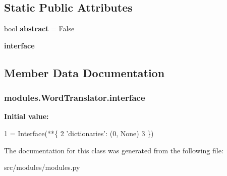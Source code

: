 \subsection*{Static Public Attributes}
\begin{DoxyCompactItemize}
\item 
bool {\bfseries abstract} = False\hypertarget{classmodules_1_1WordTranslator_aa661d20eaf599e5652b246ede4d04e7a}{}\label{classmodules_1_1WordTranslator_aa661d20eaf599e5652b246ede4d04e7a}

\item 
{\bfseries interface}
\end{DoxyCompactItemize}


\subsection{Member Data Documentation}
\subsubsection[{\texorpdfstring{interface}{interface}}]{\setlength{\rightskip}{0pt plus 5cm}modules.\+Word\+Translator.\+interface\hspace{0.3cm}{\ttfamily [static]}}\hypertarget{classmodules_1_1WordTranslator_ac543327e538006b1c1a34948f2f548d3}{}\label{classmodules_1_1WordTranslator_ac543327e538006b1c1a34948f2f548d3}
{\bfseries Initial value\+:}
\begin{DoxyCode}
1 = Interface(**\{
2         \textcolor{stringliteral}{'dictionaries'}:   (0, \textcolor{keywordtype}{None})
3     \})
\end{DoxyCode}


The documentation for this class was generated from the following file\+:\begin{DoxyCompactItemize}
\item 
src/modules/modules.\+py\end{DoxyCompactItemize}
